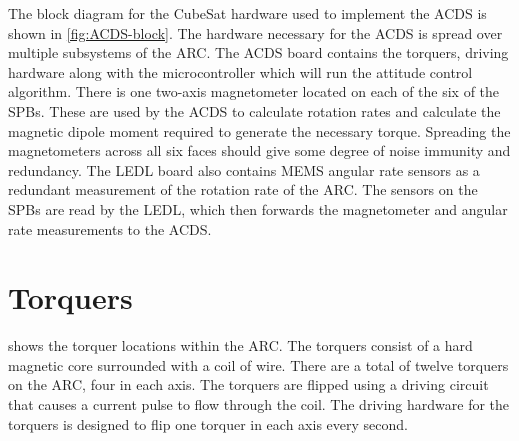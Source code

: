 The block diagram for the CubeSat hardware used to implement the \ac{ACDS} is shown in \cref{fig:ACDS-block}. The hardware necessary for the \ac{ACDS} is spread over multiple subsystems of the \ac{ARC}. The \ac{ACDS} board contains the torquers, driving hardware along with the microcontroller which will run the attitude control algorithm. There is one two-axis magnetometer located on each of the six of the \acp{SPB}. These are used by the \ac{ACDS} to calculate rotation rates and calculate the magnetic dipole moment required to generate the necessary torque. Spreading the magnetometers across all six faces should give some degree of noise immunity and redundancy. The \ac{LEDL} board also contains \ac{MEMS} angular rate sensors as a redundant measurement of the rotation rate of the \ac{ARC}. The sensors on the \acp{SPB} are read by the \ac{LEDL}, which then forwards the magnetometer and angular rate measurements to the \ac{ACDS}.

\section{Torquers}

 shows the torquer locations within the \ac{ARC}. The torquers consist of a hard magnetic core surrounded with a coil of wire. There are a total of twelve torquers on the \ac{ARC}, four in each axis. The torquers are flipped using a driving circuit that causes a current pulse to flow through the coil. The driving hardware for the torquers is designed to flip one torquer in each axis every second.

